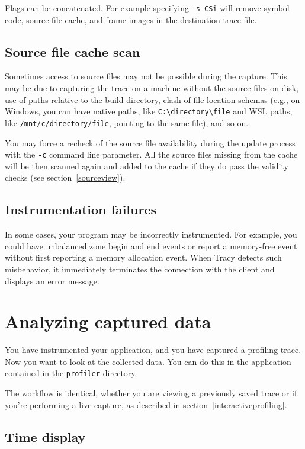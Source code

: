 \documentclass[hidelinks,titlepage,a4paper,twoside]{article}
\begin{document}
Flags can be concatenated. For example specifying \texttt{-s CSi} will remove symbol code, source file cache, and frame images in the destination trace file.

\subsection{Source file cache scan}

Sometimes access to source files may not be possible during the capture. This may be due to capturing the trace on a machine without the source files on disk, use of paths relative to the build directory, clash of file location schemas (e.g., on Windows, you can have native paths, like \texttt{C:\textbackslash{}directory\textbackslash{}file} and WSL paths, like \texttt{/mnt/c/directory/file}, pointing to the same file), and so on.

You may force a recheck of the source file availability during the update process with the \texttt{-c} command line parameter. All the source files missing from the cache will be then scanned again and added to the cache if they do pass the validity checks (see section~\ref{sourceview}).

\subsection{Instrumentation failures}
\label{instrumentationfailures}

In some cases, your program may be incorrectly instrumented. For example, you could have unbalanced zone begin and end events or report a memory-free event without first reporting a memory allocation event. When Tracy detects such misbehavior, it immediately terminates the connection with the client and displays an error message.

\section{Analyzing captured data}
\label{analyzingdata}

You have instrumented your application, and you have captured a profiling trace. Now you want to look at the collected data. You can do this in the application contained in the \texttt{profiler} directory.

The workflow is identical, whether you are viewing a previously saved trace or if you're performing a live capture, as described in section~\ref{interactiveprofiling}.

\subsection{Time display}
\end{document}
